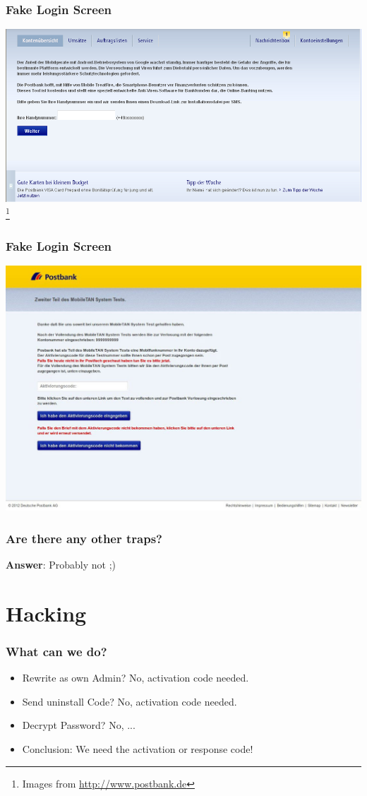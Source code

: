 \documentclass[12pt,a4paper]{beamer}
\newcommand\blfootnote[1]{%
  \begingroup
  \renewcommand\thefootnote{}\footnote{#1}%
  \addtocounter{footnote}{-1}%
  \endgroup
}
\begin{document}
\begin{frame}
\frametitle{Fake Login Screen}
\includegraphics[width=\textwidth]{images/abfrage-der-rufnummer.png}
\blfootnote{Images from \url{http://www.postbank.de}}
\end{frame}

\begin{frame}
\frametitle{Fake Login Screen}
\includegraphics[width=\textwidth]{images/aktivierunsgcode-bank.jpg}
\end{frame}

\begin{frame}
\frametitle{Are there any other traps?}

\textbf{Answer}: Probably not ;)

\end{frame}

\section{Hacking}
\begin{frame}
\frametitle{What can we do?}
\begin{itemize}
	\item Rewrite as own Admin? No, activation code needed.
	\item Send uninstall Code? No, activation code needed.
	\item Decrypt Password? No, ...
	\item Conclusion: We need the activation or response code!
\end{itemize}

\end{frame}
\end{document}
